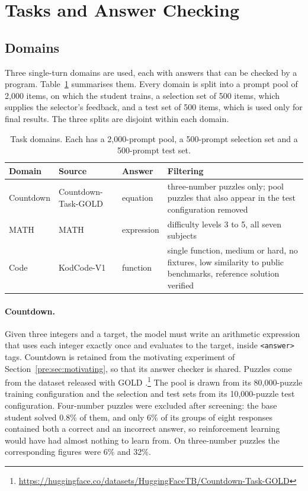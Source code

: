 \section{Tasks and Answer Checking}
\label{imp:sec:tasks}

\subsection{Domains}
\label{imp:sec:domains}

Three single-turn domains are used, each with answers that can be checked by a
program. Table~\ref{imp:tab:domains} summarises them. Every domain is split into a
prompt pool of 2,000 items, on which the student trains, a selection set of 500 items, which supplies the selector's
feedback, and a test set of 500 items, which is used only for final results. The three
splits are disjoint within each domain.

\begin{table}[htbp]
\centering
\small
\begin{tabular}{@{}lllp{5.4cm}@{}}
\toprule
\textbf{Domain} & \textbf{Source} & \textbf{Answer} & \textbf{Filtering} \\
\midrule
Countdown & Countdown-Task-GOLD & equation & three-number puzzles only; pool puzzles that also
  appear in the test configuration removed \\
MATH & MATH \autocite{hendrycks_math_2021} & expression & difficulty levels 3 to 5, all
  seven subjects \\
Code & KodCode-V1 \autocite{xu_kodcode_2025} & function & single function, medium or
  hard, no fixtures, low similarity to public benchmarks, reference solution verified \\
\bottomrule
\end{tabular}
\caption{Task domains. Each has a 2,000-prompt pool, a 500-prompt selection set and a
500-prompt test set.}
\label{imp:tab:domains}
\end{table}

\paragraph{Countdown.} Given three integers and a target, the model must write an
arithmetic expression that uses each integer exactly once and evaluates to the target,
inside \texttt{<answer>} tags. Countdown is retained from the motivating experiment of
Section~\ref{pre:sec:motivating}, so that its answer checker is shared. Puzzles come
from the dataset released with GOLD \autocite{patino_gold_2025}.\footnote{\url{https://huggingface.co/datasets/HuggingFaceTB/Countdown-Task-GOLD}}
The pool is drawn from its 80,000-puzzle training configuration and the selection and
test sets from its 10,000-puzzle test configuration. Four-number puzzles were excluded
after screening: the base student solved 0.8\% of them, and only 6\% of its groups of
eight responses contained both a correct and an incorrect answer, so reinforcement
learning would have had almost nothing to learn from. On three-number puzzles the
corresponding figures were 6\% and 32\%.

